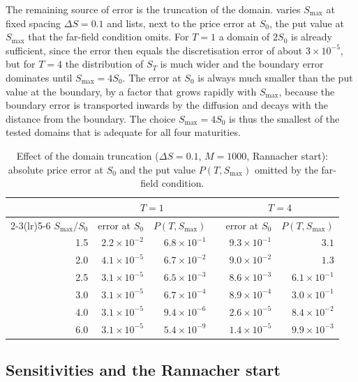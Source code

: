 \documentclass[11pt,a4paper]{article}
\begin{document}
The remaining source of error is the truncation of the domain.
 varies $S_{\max}$ at fixed spacing $\Delta S=0.1$ and lists, next to the price error at $S_0$, the put value at $S_{\max}$ that the far-field condition omits.
For $T=1$ a domain of $2S_0$ is already sufficient, since the error then equals the discretisation error of about $3\times10^{-5}$, but for $T=4$ the distribution of $S_T$ is much wider and the boundary error dominates until $S_{\max}=4S_0$.
The error at $S_0$ is always much smaller than the put value at the boundary, by a factor that grows rapidly with $S_{\max}$, because the boundary error is transported inwards by the diffusion and decays with the distance from the boundary.
The choice $S_{\max}=4S_0$ is thus the smallest of the tested domains that is adequate for all four maturities.

\begin{table}[ht]
\centering
\caption{Effect of the domain truncation ($\Delta S=0.1$, $M=1000$, Rannacher start): absolute price error at $S_0$ and the put value $P(T,S_{\max})$ omitted by the far-field condition.}\label{tab:domain}
\small
\begin{tabular}{rrrcrr}
\toprule
& \multicolumn{2}{c}{$T=1$} && \multicolumn{2}{c}{$T=4$} \\
\cmidrule(lr){2-3}\cmidrule(lr){5-6}
$S_{\max}/S_0$ & error at $S_0$ & $P(T,S_{\max})$ && error at $S_0$ & $P(T,S_{\max})$ \\
\midrule
1.5 & $2.2\times10^{-2}$ & $6.8\times10^{-1}$ && $9.3\times10^{-1}$ & $3.1$ \\
2.0 & $4.1\times10^{-5}$ & $6.7\times10^{-2}$ && $9.0\times10^{-2}$ & $1.3$ \\
2.5 & $3.1\times10^{-5}$ & $6.5\times10^{-3}$ && $8.6\times10^{-3}$ & $6.1\times10^{-1}$ \\
3.0 & $3.1\times10^{-5}$ & $6.7\times10^{-4}$ && $8.9\times10^{-4}$ & $3.0\times10^{-1}$ \\
4.0 & $3.1\times10^{-5}$ & $9.4\times10^{-6}$ && $2.6\times10^{-5}$ & $8.4\times10^{-2}$ \\
6.0 & $3.1\times10^{-5}$ & $5.4\times10^{-9}$ && $1.4\times10^{-5}$ & $9.9\times10^{-3}$ \\
\bottomrule
\end{tabular}
\end{table}

\subsection{Sensitivities and the Rannacher start}\label{sec:greeks}
\end{document}
